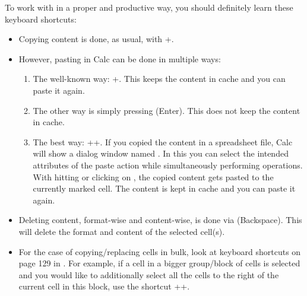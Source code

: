 To work with \tfn in a proper and productive way, you should definitely learn these keyboard shortcuts:
\begin{itemize}
	\item Copying content is done, as usual, with +.
	\item However, pasting in Calc can be done in multiple ways:
	\begin{enumerate}
		\item The well-known way: +.
		This keeps the content in cache and you can paste it again.
		\item The other way is simply pressing \keystroke{\( \hookleftarrow \)} (Enter).
		This does not keep the content in cache.
		\item The best way: ++.
		If you copied the content in a spreadsheet file, Calc will show a dialog window named .
		In this you can select the intended attributes of the paste action while simultaneously performing operations.
		With hitting \keystroke{\( \hookleftarrow \)} or clicking on , the copied content gets pasted to the currently marked cell.
		The content is kept in cache and you can paste it again.
	\end{enumerate}
	\item Deleting content, format-wise and content-wise, is done via \keystroke{\( \longleftarrow \)} (Backspace).
	This will delete the format and content of the selected cell(s).
	\item For the case of copying/replacing cells in bulk, look at keyboard shortcuts on page 129 in .
	For example, if a cell in a bigger group/block of cells is selected and you would like to additionally select all the cells to the right of the current cell in this block, use the shortcut ++\keystroke{\( \rightarrow \)}.
\end{itemize}

